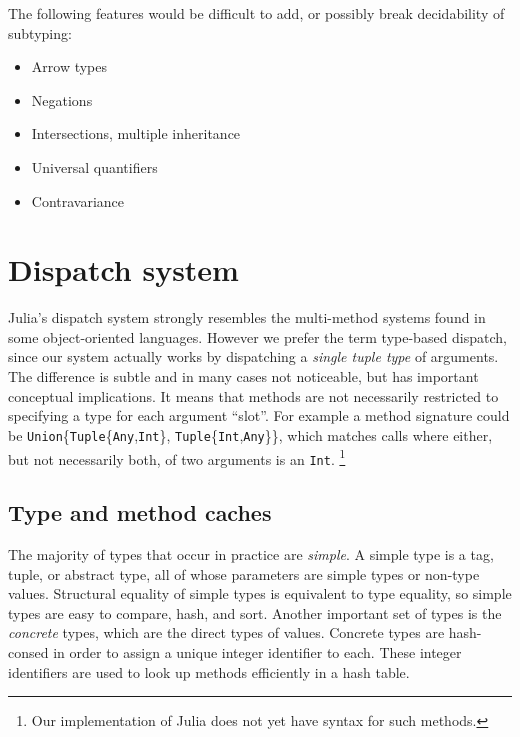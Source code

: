 \noindent
The following features would be difficult to add, or possibly break decidability
of subtyping:

\vspace{-3ex}
\begin{singlespace}
\begin{itemize}
\item Arrow types
\item Negations
\item Intersections, multiple inheritance
\item Universal quantifiers
\item Contravariance
\end{itemize}
\end{singlespace}


\section{Dispatch system}

Julia's dispatch system strongly resembles the multi-method systems
found in some object-oriented languages.
However we prefer the term type-based dispatch, since our system
actually works by dispatching a \emph{single tuple type} of arguments.
The difference is subtle and in many cases not noticeable, but has
important conceptual implications.
It means that methods are not necessarily restricted to specifying
a type for each argument ``slot''.
For example a method signature could be
\texttt{Union}\{\texttt{Tuple}\{\texttt{Any},\texttt{Int}\}, \texttt{Tuple}\{\texttt{Int},\texttt{Any}\}\},
which matches calls where either, but not necessarily both, of two
arguments is an \texttt{Int}.
\footnote{Our implementation of Julia does not yet have syntax for such methods.}

\subsection{Type and method caches}

The majority of types that occur in practice are \emph{simple}.
A simple type is a tag, tuple, or abstract type, all of whose parameters
are simple types or non-type values.
Structural equality of simple types is equivalent to type equality,
so simple types are easy to compare, hash, and sort.
Another important set of types is the \emph{concrete} types, which
are the direct types of values.
Concrete types are hash-consed in order to assign a unique integer
identifier to each.
These integer identifiers are used to look up methods efficiently
in a hash table.

